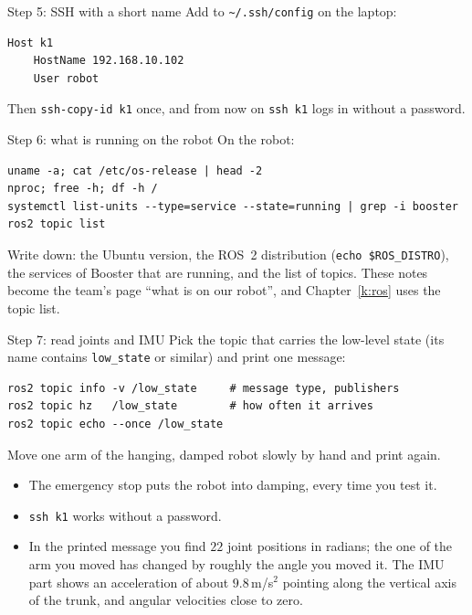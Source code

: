 \begin{stepbox}{Step 5: SSH with a short name}
Add to \verb!~/.ssh/config! on the laptop:
\begin{verbatim}
Host k1
    HostName 192.168.10.102
    User robot
\end{verbatim}
Then \verb!ssh-copy-id k1! once, and from now on \verb!ssh k1! logs in without a password.
\end{stepbox}

\begin{stepbox}{Step 6: what is running on the robot}
On the robot:
\begin{verbatim}
uname -a; cat /etc/os-release | head -2
nproc; free -h; df -h /
systemctl list-units --type=service --state=running | grep -i booster
ros2 topic list
\end{verbatim}
Write down: the Ubuntu version, the ROS~2 distribution (\verb!echo $ROS_DISTRO!), the services of Booster that are running, and the list of topics. These notes become the team's page ``what is on our robot'', and Chapter~\ref{k:ros} uses the topic list.
\end{stepbox}

\begin{stepbox}{Step 7: read joints and IMU}
Pick the topic that carries the low-level state (its name contains \texttt{low\_state} or similar\guess) and print one message:
\begin{verbatim}
ros2 topic info -v /low_state     # message type, publishers
ros2 topic hz   /low_state        # how often it arrives
ros2 topic echo --once /low_state
\end{verbatim}
Move one arm of the hanging, damped robot slowly by hand and print again.
\end{stepbox}

\begin{checkbox}
\begin{itemize}[nosep]
  \item The emergency stop puts the robot into damping, every time you test it.
  \item \verb!ssh k1! works without a password.
  \item In the printed message you find $22$ joint positions in radians; the one of the arm you moved has changed by roughly the angle you moved it. The IMU part shows an acceleration of about $9.8$\,m/s$^2$ pointing along the vertical axis of the trunk, and angular velocities close to zero.
\end{itemize}
\end{checkbox}

